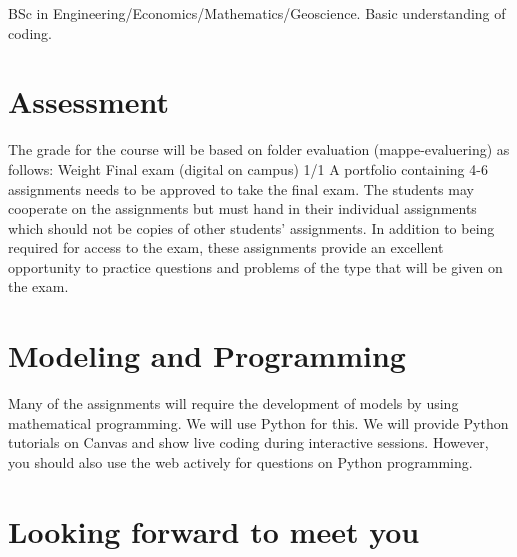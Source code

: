 \documentclass[letterpaper,12pt,oneside]{article}
\begin{document}
BSc in Engineering/Economics/Mathematics/Geoscience. Basic understanding of coding.

\section*{Assessment}

The grade for the course will be based on folder evaluation (mappe-evaluering) as follows:
Weight
Final exam (digital on campus) 1/1
A portfolio containing 4-6 assignments needs to be approved to take the final exam. The students
may cooperate on the assignments but must hand in their individual assignments which should
not be copies of other students’ assignments.
In addition to being required for access to the exam, these assignments provide an excellent
opportunity to practice questions and problems of the type that will be given on the exam.


\section*{Modeling and Programming}

Many of the assignments will require the development of models by using mathematical
programming. We will use Python for this. We will provide Python tutorials on Canvas and show
live coding during interactive sessions. However, you should also use the web actively for questions
on Python programming.

 
 \vspace{4em}
\section*{Looking forward to meet you}
\end{document}
